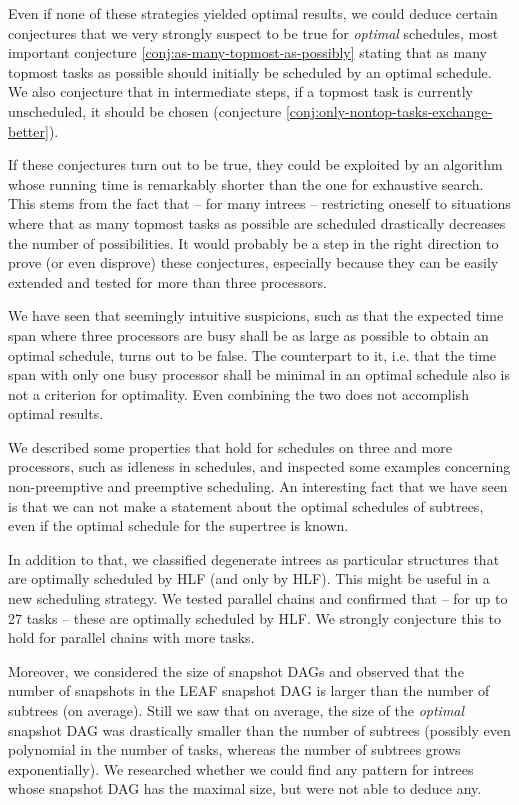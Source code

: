 Even if none of these strategies yielded optimal results, we could deduce certain conjectures that we very strongly suspect to be true for \emph{optimal} schedules, most important conjecture \ref{conj:as-many-topmost-as-possibly} stating that as many topmost tasks as possible should initially be scheduled by an optimal schedule. We also conjecture that in intermediate steps, if a topmost task is currently unscheduled, it should be chosen (conjecture \ref{conj:only-nontop-tasks-exchange-better}).

If these conjectures turn out to be true, they could be exploited by an algorithm whose running time is remarkably shorter than the one for exhaustive search. This stems from the fact that -- for many intrees -- restricting oneself to situations where that as many topmost tasks as possible are scheduled drastically decreases the number of possibilities. It would probably be a step in the right direction to prove (or even disprove) these conjectures, especially because they can be easily extended and tested for more than three processors.

We have seen that seemingly intuitive suspicions, such as that the expected time span where three processors are busy shall be as large as possible to obtain an optimal schedule, turns out to be false. The counterpart to it, i.e. that the time span with only one busy processor shall be minimal in an optimal schedule also is not a criterion for optimality. Even combining the two does not accomplish optimal results.

We described some properties that hold for schedules on three and more processors, such as idleness in schedules, and inspected some examples concerning non-preemptive and preemptive scheduling. An interesting fact that we have seen is that we can not make a statement about the optimal schedules of subtrees, even if the optimal schedule for the supertree is known.

In addition to that, we classified degenerate intrees as particular structures that are optimally scheduled by HLF (and only by HLF). This might be useful in a new scheduling strategy. We tested parallel chains and confirmed that -- for up to 27 tasks -- these are optimally scheduled by HLF. We strongly conjecture this to hold for parallel chains with more tasks.

Moreover, we considered the size of snapshot DAGs and observed that the number of snapshots in the LEAF snapshot DAG is larger than the number of subtrees (on average). Still we saw that on average, the size of the \emph{optimal} snapshot DAG was drastically smaller than the number of subtrees (possibly even polynomial in the number of tasks, whereas the number of subtrees grows exponentially). We researched whether we could find any pattern for intrees whose snapshot DAG has the maximal size, but were not able to deduce any.

